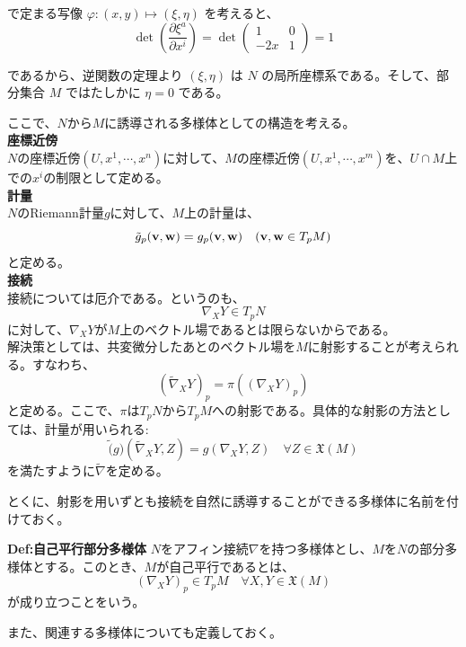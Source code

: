 \documentclass[a4paper,11pt]{jsarticle}
\numberwithin{equation}{section}
\begin{document}
で定まる写像 \(\varphi : (x, y) \mapsto (\xi, \eta)\) を考えると、
\begin{equation}
\det \left( \frac{\partial \xi^a}{\partial x^i} \right) = \det \begin{pmatrix}
1 & 0 \\
-2x & 1
\end{pmatrix} = 1
\tag{3.244}
\end{equation}

であるから、逆関数の定理より \((\xi, \eta)\) は \(N\) の局所座標系である。そして、部分集合 \(M\) ではたしかに \(\eta = 0\) である。


ここで、$N$から$M$に誘導される多様体としての構造を考える。\\
\textbf{座標近傍}\\
$N$の座標近傍$(U,x^1,\cdots,x^n)$に対して、$M$の座標近傍$(U,x^1,\cdots,x^m)$を、$U \cap M$上での$x^i$の制限として定める。\\

\textbf{計量}\\
$N$のRiemann計量$g$に対して、$M$上の計量は、
\begin{equation}
    \tilde{g}_p(\vb{v},\vb{w}) = g_p(\vb{v},\vb{w}) \quad (\vb{v},\vb{w} \in T_pM)
\end{equation}
と定める。\\

\textbf{接続}\\
接続については厄介である。というのも、
\begin{equation}
    \nabla_X Y \in T_pN
\end{equation}
に対して、$\nabla_X Y$が$M$上のベクトル場であるとは限らないからである。\\
解決策としては、共変微分したあとのベクトル場を$M$に射影することが考えられる。すなわち、
\begin{equation}
    (\tilde{\nabla}_X Y)_p = \pi((\nabla_X Y)_p)
\end{equation}
と定める。ここで、$\pi$は$T_pN$から$T_pM$への射影である。具体的な射影の方法としては、計量が用いられる:
\begin{equation}
    \tilde(g)(\tilde{\nabla}_X Y, Z) = g(\nabla_X Y, Z) \quad \forall Z \in \mathfrak{X}(M)
\end{equation}
を満たすように$\tilde{\nabla}$を定める。%

とくに、射影を用いずとも接続を自然に誘導することができる多様体に名前を付けておく。
\begin{itembox}[l]{\textbf{Def:自己平行部分多様体}}
    $N$をアフィン接続$\nabla$を持つ多様体とし、$M$を$N$の部分多様体とする。このとき、$M$が自己平行であるとは、
    \begin{equation}
        (\nabla_X Y)_p \in T_pM \quad \forall X,Y \in \mathfrak{X}(M)
    \end{equation}
    が成り立つことをいう。

\end{itembox}
また、関連する多様体についても定義しておく。
\end{document}
